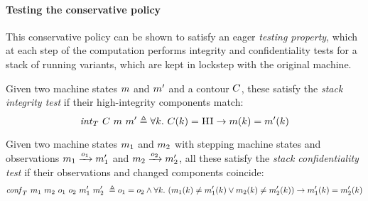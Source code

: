 \documentclass[acmsmall,review,anonymous]{acmart}\settopmatter{printfolios=true,printccs=false,printacmref=false}
\begin{document}

\paragraph*{Testing the conservative policy}
%
This conservative policy can be shown to satisfy an eager \emph{testing
property}, which at each step of the computation performs integrity and
confidentiality tests for a stack of running variants, which are kept in
lockstep with the original machine.

  Given two machine states $m$ and $m'$ and a contour $C$, these
  satisfy the \emph{stack integrity test} if their high-integrity components
  match:
  \[
    \mathit{int}_T ~ C ~ m ~ m' \triangleq
    \forall k . ~
    C(k) = \textsc{HI} \rightarrow
    m(k) = m'(k)
  \]

  Given two machine states $m_1$ and $m_2$ with stepping machine states
  and observations $m_1 \xrightarrow{o_1} m_1'$ and $m_2
  \xrightarrow{o_2} m_2'$, all these satisfy the \emph{stack
    confidentiality test} if their observations and changed components coincide:
  \[
    \mathit{conf}_T ~ m_1 ~ m_2 ~ o_1 ~ o_2 ~ m_1' ~ m_2' ~ \triangleq
    o_1 = o_2 \wedge \forall k . ~
   (     m_1(k) \neq m_1'(k)
    \vee m_2(k) \neq m_2'(k))
    \rightarrow m_1'(k) = m_2'(k)
  \]
\newcommand{\vse}{\mathit{vse}}
\newcommand{\VSES}{\mathit{VSE}}
\newcommand{\vs}{\mathit{vs}}
\newcommand{\VSS}{\mathit{VS}}
\end{document}
